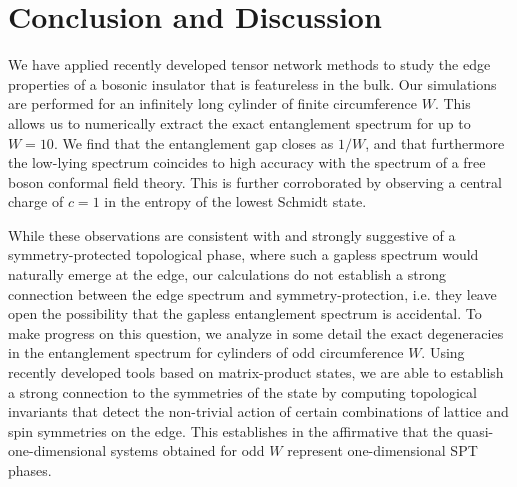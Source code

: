 
\section{Conclusion and Discussion}

We have applied recently developed tensor network methods to study the edge properties
of a bosonic insulator that is featureless in the bulk. Our simulations are performed for an infinitely
long cylinder of finite circumference $W$. This allows us to numerically extract the exact entanglement
spectrum for up to $W = 10$. We find that the entanglement gap closes as $1/W$, and that furthermore
the low-lying spectrum coincides to high accuracy with the spectrum of a free boson conformal field theory.
This is further corroborated by observing a central charge of $c=1$ in the entropy of the lowest Schmidt state.

While these observations are consistent with and strongly suggestive of a symmetry-protected topological
phase, where such a gapless spectrum would naturally emerge at the edge, our calculations do not establish
a strong connection between the edge spectrum and symmetry-protection, i.e. they leave open the possibility
that the gapless entanglement spectrum is accidental.
To make progress on this question, we analyze in some detail the exact degeneracies in the entanglement
spectrum for cylinders of odd circumference $W$. Using recently developed tools based on matrix-product
states, we are able to establish a strong connection to the symmetries of the state by computing topological
invariants that detect the non-trivial action of certain combinations of lattice and spin symmetries on the edge.
This establishes in the affirmative that the quasi-one-dimensional systems obtained for odd $W$ represent
one-dimensional SPT phases.

